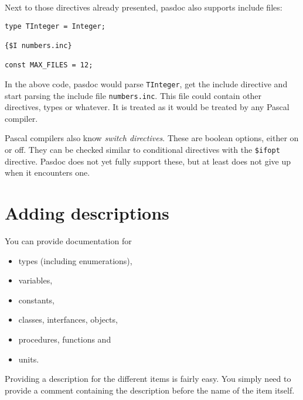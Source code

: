 \documentclass[11pt]{article}
\begin{document}
Next to those directives already presented, pasdoc also supports include
files:

\begin{verbatim}
type TInteger = Integer;

{$I numbers.inc}

const MAX_FILES = 12;
\end{verbatim}

In the above code, pasdoc would parse {\tt TInteger}, get the include
directive and start parsing the include file {\tt numbers.inc}.
This file could contain other directives, types or whatever.
It is treated as it would be treated by any Pascal compiler.

Pascal compilers also know \emph{switch directives}.
These are boolean options, either on or off.
They can be checked similar to conditional directives with
the {\tt \$ifopt} directive.
Pasdoc does not yet fully support these, but at least does not give
up when it encounters one.

\section{Adding descriptions}

You can provide documentation for

\begin{itemize}
\item types (including enumerations),
\item variables,
\item constants,
\item classes, interfances, objects,
\item procedures, functions and
\item units.
\end{itemize}

Providing a description for the different items is fairly easy. You simply
need to provide a comment containing the description before the name of
the item itself. 
\end{document}
